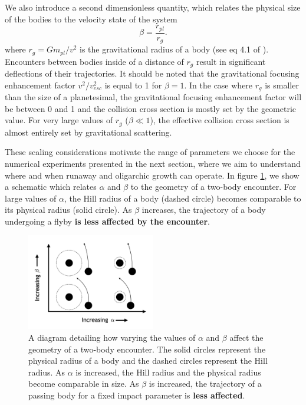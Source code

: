 \documentclass[twocolumn,linenumbers]{aastex63}
\begin{document}
We also introduce a second dimensionless quantity, which relates the physical size of the bodies to the velocity state of the system
\begin{equation}\label{eq:beta}
	\beta = \frac{r_{pl}}{r_{g}}.
\end{equation}
where $r_{g} = G m_{pl} / v^{2}$ is the gravitational radius of a body (see eq 4.1 of \citet{ida90}). Encounters between bodies inside of a distance of $r_{g}$ result in significant deflections of their trajectories. It should be noted that the gravitational focusing enhancement factor $v^{2}/v_{esc}^{2}$ is equal to 1 for $\beta = 1$. In the case where $r_{g}$ is smaller than the size of a planetesimal, the gravitational focusing enhancement factor will be between 0 and 1 and the collision cross section is mostly set by the geometric value. For very large values of $r_{g}$ ($\beta \ll 1$), the effective collision cross section is almost entirely set by gravitational scattering.

These scaling considerations motivate the range of parameters we choose for the numerical experiments presented in the next section, where we aim to understand where and when runaway and oligarchic growth can operate. In figure \ref{fig:alpha_beta_diagram}, we show a schematic which relates $\alpha$ and $\beta$ to the geometry of a two-body encounter. For large values of $\alpha$, the Hill radius of a body (dashed circle) becomes comparable to its physical radius (solid circle). As $\beta$ increases, the trajectory of a body undergoing a flyby \textbf{is less affected by the encounter}.

\begin{figure}
\begin{center}
    \includegraphics[width=0.5\textwidth]{figures/diagram.png}
    \caption{A diagram detailing how varying the values of $\alpha$ and $\beta$ affect the geometry of a two-body encounter. The solid circles represent the physical radius of a body and the dashed circles represent the Hill radius. As $\alpha$ is increased, the Hill radius and the physical radius become comparable in size. As $\beta$ is increased, the trajectory of a passing body for a fixed impact parameter is \textbf{less affected}.
      \label{fig:alpha_beta_diagram}}
\end{center}
\end{figure}
\end{document}
